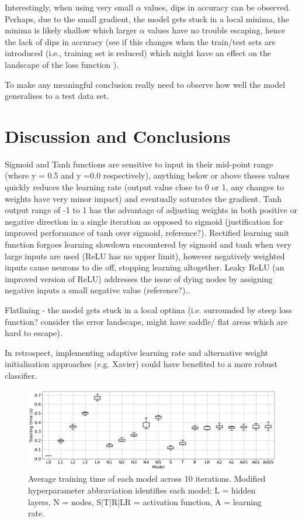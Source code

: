 \documentclass{article}
\begin{document}
Interestingly, when using very small $\alpha$ values, dips in accuracy can be observed. Perhaps, due to the small gradient, the model gets stuck in a local minima, the minima is likely shallow which larger $\alpha$ values have no trouble escaping, hence the lack of dips in accuracy (see if this changes when the train/test sets are introduced (i.e., training set is reduced) which might have an effect on the landscape of the loss function \cite{Guo}).

To make any meaningful conclusion really need to observe how well the model generalises to a test data set.

\section{Discussion and Conclusions}
Sigmoid and Tanh functions are sensitive to input in their mid-point range (where y = 0.5 and y =0.0 respectively), anything below or above theses values quickly reduces the learning rate (output value close to 0 or 1, any changes to weights have very minor impact) and eventually saturates the gradient.
Tanh output range of -1 to 1 has the advantage of adjusting weights in both positive or negative direction in a single iteration as opposed to sigmoid (justification for improved performance of tanh over sigmoid, reference?).
Rectified learning unit function forgoes learning slowdown encountered by sigmoid and tanh when very large inputs are used (ReLU has no upper limit), however negatively weighted inputs cause neurons to die off, stopping learning altogether. Leaky ReLU (an improved version of ReLU) addresses the issue of dying nodes by assigning negative inputs a small negative value (reference?)..

Flatlining - the model gets stuck in a local optima (i.e. surrounded by steep loss function? consider the error landscape, might have saddle/ flat areas which are hard to escape).

In retrospect, implementing adaptive learning rate and alternative weight initialisation approaches (e.g. Xavier) could have benefited to a more robust classifier.

\begin{figure}[H]
  \centering
  \includegraphics[width=\textwidth]{figs/times.png}
  \caption{
    Average training time of each model across 10 iterations.
    Modified hyperparameter abbraviation identifies each model:
    L = hidden layers, N = nodes, S|T|R|LR = activation function,
    A = learning rate.
  }
  \label{fig:times}
\end{figure}
\end{document}
